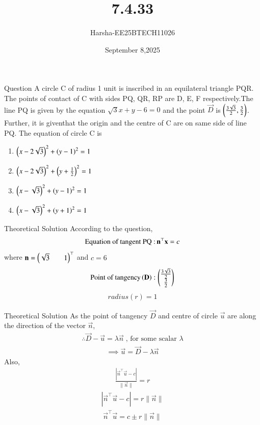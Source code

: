 \documentclass{beamer}
\title %
{7.4.33}
\date{September 8,2025}
\author %
{Harsha-EE25BTECH11026}
\begin{document}
\frame{\titlepage}


\begin{frame}{Question}
A circle C of radius 1 unit is inscribed in an equilateral triangle PQR. The points of contact of C with sides PQ, QR, RP are D, E, F respectively.The line PQ is given by the equation $\sqrt{3}x+y-6=0$ and the point $\vec{D}$ is $\brak{\frac{3\sqrt{3}}{2},\frac{3}{2}}$. Further, it is giventhat the origin and the centre of C are on same side of line PQ. The equation of circle C is
\begin{enumerate}
    \item $\brak{x-2\sqrt{3}}^2+\brak{y-1}^2=1$
    \item $\brak{x-2\sqrt{3}}^2+\brak{y+\frac{1}{2}}^2=1$
    \item $\brak{x-\sqrt{3}}^2+\brak{y-1}^2=1$
    \item $\brak{x-\sqrt{3}}^2+\brak{y+1}^2=1$
\end{enumerate}
\end{frame}

\begin{frame}{Theoretical Solution}
According to the question,
\begin{align}
    \text{Equation of tangent PQ :\,}\vec{n}^{\top}\vec{x}=c
\end{align}
where $\vec{n}=\myvec{\sqrt{3}&&1}^{\top}$ and $c=6$
\begin{align}
    \text{Point of tangency}\brak{\vec{D}}:\myvec{\frac{3\sqrt{3}}{2}\\\frac{3}{2}}
\end{align}
\begin{align}
    radius(r)=1
\end{align}
\end{frame}

\begin{frame}{Theoretical Solution}
As the point of tangency $\vec{D}$ and centre of circle $\vec{u}$  are along the direction of the vector $\vec{n}$,
\begin{align}
    \therefore \vec{D}-\vec{u}=\lambda\vec{n}\;\text{, for some scalar $\lambda$}
\end{align}
\begin{align}
    \implies \vec{u}=\vec{D}-\lambda\vec{n}
\end{align}
Also,
\begin{align}
    \frac{|\vec{n}^{\top}\vec{u}-c|}{\|\vec{n}\|}=r
\end{align}
\begin{align}
    |\vec{n}^{\top}\vec{u}-c|=r\|\vec{n}\|
\end{align}
\begin{align}
    \vec{n}^{\top}\vec{u}=c \pm r\|\vec{n}\|
\end{align}
\end{frame}
\end{document}
